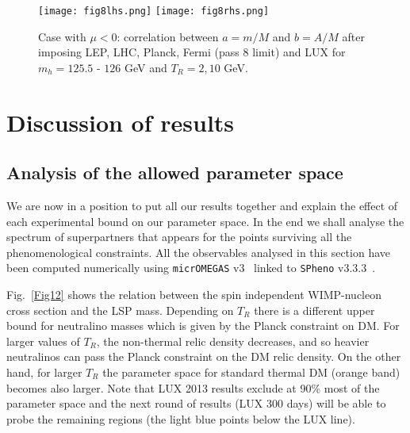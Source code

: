 \documentclass[11pt,a4paper]{article}
\begin{document}
\begin{figure}[!ht]
\centering
\texttt{[image: fig8lhs.png]}
\texttt{[image: fig8rhs.png]}
\caption{Case with $\mu<0$: correlation between $a=m/M$ and $b=A/M$ after imposing LEP, LHC, Planck, Fermi (pass 8 limit)
and LUX for $m_h = 125.5$ - $126$ GeV and $T_R = 2, 10$ GeV.}
\label{Fig11}
\end{figure}

\newpage
\section{Discussion of results}\vspace{-0.1cm}
\subsection{Analysis of the allowed parameter space}\vspace{-0.1cm}
We are now in a position to put all our results together and explain the effect of each experimental bound on our parameter space.
In the end we shall analyse the spectrum of superpartners that appears for the points surviving all the phenomenological constraints. All the observables analysed in this section have been computed numerically using \verb"micrOMEGAS" v3~\cite{micromegas} linked to \verb"SPheno" v3.3.3~\cite{spheno}.

Fig.~\ref{Fig12} shows the relation between the spin independent WIMP-nucleon cross section and the LSP mass. Depending on $T_R$ there is a different upper bound for neutralino masses which is given by the Planck constraint on DM. For larger values of $T_R$, the non-thermal relic density decreases, 
and so heavier neutralinos can pass the Planck constraint on the DM relic density. On the other hand, for larger $T_R$ the parameter space for standard thermal DM (orange band) becomes also larger. Note that LUX 2013 results exclude at 90\% most of the parameter space and the next round of results (LUX 300 days) will be able to probe the remaining regions (the light blue points below the LUX line).
\end{document}

